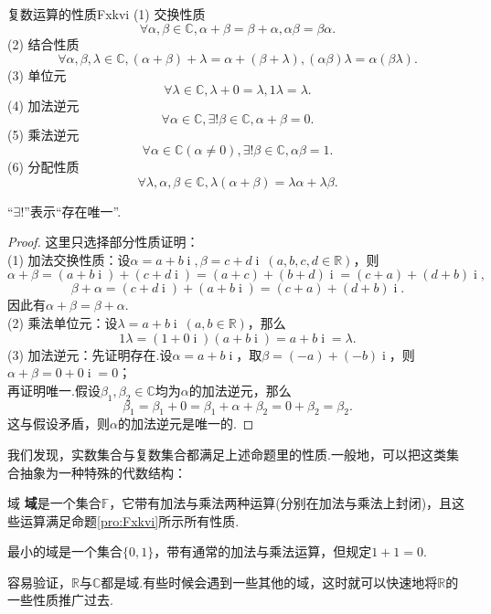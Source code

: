 \documentclass[lang=cn, zihao=5]{elegantbook}
\newcommand{\R}{\mathbb{R}}
\newcommand{\C}{\mathbb{C}}
\newcommand{\F}{\mathbb{F}}
\DeclareMathOperator{\ii}{i}
\begin{document}
\begin{proposition}{复数运算的性质}{Fxkvi}
	(1) 交换性质$$\forall \alpha , \beta \in \C , \alpha + \beta = \beta + \alpha , \alpha \beta = \beta \alpha.$$
	(2) 结合性质$$\forall \alpha , \beta , \lambda \in \C , (\alpha + \beta) + \lambda = \alpha + (\beta + \lambda) , (\alpha \beta) \lambda = \alpha (\beta \lambda).$$
	(3) 单位元$$\forall \lambda \in \C , \lambda + 0 = \lambda , 1 \lambda = \lambda.$$
	(4) 加法逆元$$\forall \alpha \in \C , \exists ! \beta \in \C , \alpha + \beta = 0.$$
	(5) 乘法逆元$$\forall \alpha \in \C (\alpha \neq 0) , \exists ! \beta \in \C , \alpha \beta = 1.$$
	(6) 分配性质$$\forall \lambda , \alpha , \beta \in \C , \lambda (\alpha + \beta) = \lambda \alpha + \lambda \beta.$$
\end{proposition}
\begin{remark}
	“$\exists !$”表示“存在唯一”.
\end{remark}
\begin{proof}
	这里只选择部分性质证明： \\
	(1) 加法交换性质：设$\alpha = a+b\ii , \beta = c+d\ii ~(a,b,c,d \in \R )$，则
	$$\alpha + \beta = (a+b\ii ) + (c+d\ii ) = (a+c) + (b+d)\ii = (c+a) + (d+b)\ii ,$$
	$$\beta + \alpha = (c+d\ii ) + (a+b\ii ) = (c+a) + (d+b)\ii .$$
	因此有$\alpha + \beta = \beta + \alpha$. \\
	(2) 乘法单位元：设$\lambda = a+b\ii ~ (a,b \in \R )$，那么$$1 \lambda = (1+0\ii )(a+b\ii ) = a + b\ii = \lambda .$$
	(3) 加法逆元：先证明存在.设$\alpha = a+b\ii $，取$\beta = (-a) + (-b)\ii $，则$\alpha + \beta = 0+0\ii = 0$；\\
	再证明唯一.假设$\beta _1, \beta _2 \in \C $均为$\alpha$的加法逆元，那么$$\beta _1 = \beta _1 + 0 = \beta _1 + \alpha + \beta _2 = 0 + \beta _2 = \beta _2 .$$
	这与假设矛盾，则$\alpha$的加法逆元是唯一的.
\end{proof}

我们发现，实数集合与复数集合都满足上述命题里的性质.一般地，可以把这类集合抽象为一种特殊的代数结构：

\begin{definition}{域}
	\textbf{域}是一个集合$\F$，它带有加法与乘法两种运算(分别在加法与乘法上封闭)，且这些运算满足命题\ref{pro:Fxkvi}所示所有性质.
\end{definition}
\begin{remark}
	最小的域是一个集合$\{ 0,1 \}$，带有通常的加法与乘法运算，但规定$1+1=0$.
\end{remark}

容易验证，$\R$与$\C$都是域.有些时候会遇到一些其他的域，这时就可以快速地将$\R$的一些性质推广过去.
\end{document}
